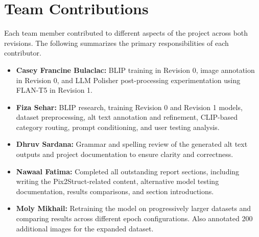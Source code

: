 \documentclass[11pt]{article}
\begin{document}
\section*{Team Contributions}

Each team member contributed to different aspects of the project across both revisions. The following summarizes the primary responsibilities of each contributor.

\begin{itemize}
    \item \textbf{Casey Francine Bulaclac:} BLIP training in Revision 0, image annotation in Revision 0, and LLM Polisher post-processing experimentation using FLAN-T5 in Revision 1.
    \item \textbf{Fiza Sehar:} BLIP research, training Revision 0 and Revision 1 models, dataset preprocessing, alt text annotation and refinement, CLIP-based category routing, prompt conditioning, and user testing analysis.
    \item \textbf{Dhruv Sardana:} Grammar and spelling review of the generated alt text outputs and project documentation to ensure clarity and correctness.
    \item \textbf{Nawaal Fatima:} Completed all outstanding report sections, including writing the Pix2Struct-related content, alternative model testing documentation, results comparisons, and section introductions.
    \item \textbf{Moly Mikhail:} Retraining the model on progressively larger datasets and comparing results across different epoch configurations. Also annotated 200 additional images for the expanded dataset.
\end{itemize}



\end{document}
